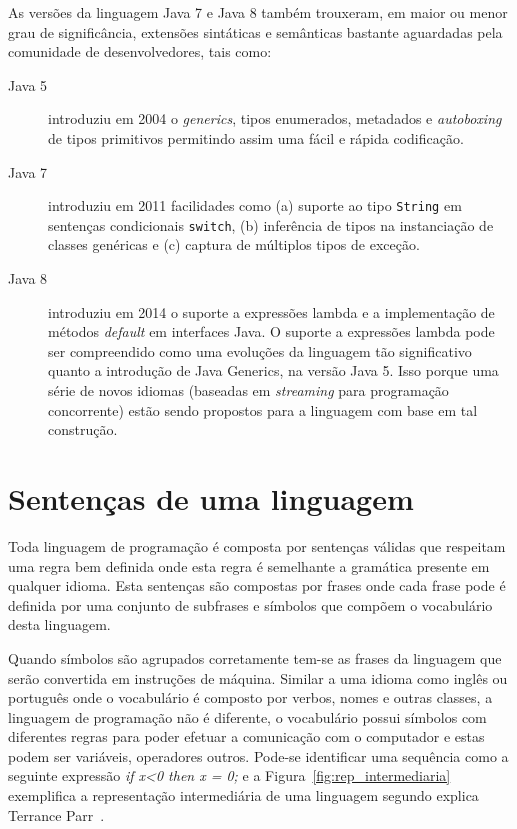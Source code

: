 As versões da linguagem Java 7 e Java 8 também trouxeram, 
em maior ou menor grau de significância, extensões sintáticas 
e semânticas bastante aguardadas pela comunidade de 
desenvolvedores, tais como:

\begin{description}
\item[Java 5] introduziu em 2004 o \textit{generics}, tipos enumerados, metadados e \textit{autoboxing} de tipos primitivos permitindo assim uma fácil e rápida codificação.

\item[Java 7] introduziu em 2011 facilidades como (a) suporte ao tipo \texttt{String} 
em sentenças condicionais \texttt{switch}, (b) inferência de tipos na instanciação de classes genéricas e (c) captura de 
múltiplos tipos de exceção. 

\item[Java 8] introduziu em 2014 o suporte a expressões lambda e a implementação de 
métodos \emph{default} em interfaces Java. O suporte a expressões lambda pode 
ser compreendido como uma evoluções da linguagem tão significativo 
quanto a introdução de Java Generics, na versão Java 5. Isso porque 
uma série de novos idiomas (baseadas em \emph{streaming} para programação 
concorrente) estão sendo propostos para a linguagem com base em tal construção.   
\end{description} 


\section{Sentenças de uma linguagem}
Toda linguagem de programação é composta por sentenças válidas que respeitam uma regra bem definida onde esta regra é semelhante a gramática presente em qualquer idioma. Esta sentenças são compostas por frases onde cada frase pode é definida por uma conjunto de subfrases e símbolos que compõem o vocabulário desta linguagem. 


Quando símbolos são agrupados corretamente tem-se as frases da linguagem que serão convertida em instruções de máquina. Similar a uma idioma como inglês ou português onde o vocabulário é composto por verbos, nomes e outras classes, a linguagem de programação não é diferente, o vocabulário possui símbolos com diferentes regras para poder efetuar a comunicação com o computador e estas podem ser variáveis, operadores outros. Pode-se identificar uma sequência como a seguinte expressão \textit{if x<0 then x = 0;} e a Figura~\ref{fig:rep_intermediaria} exemplifica a representação intermediária de uma linguagem segundo explica Terrance Parr~\cite{Parr:2009:LIP:1823613}.


